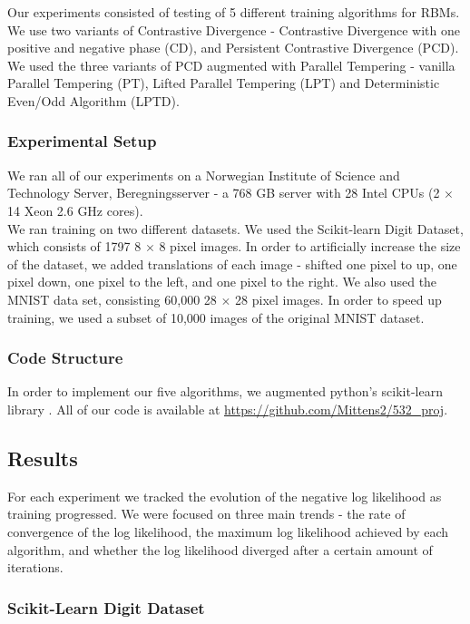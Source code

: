 Our experiments consisted of testing of 5 different training algorithms for RBMs. We use two variants of Contrastive Divergence  - Contrastive Divergence with one positive and negative phase (CD), and Persistent Contrastive Divergence (PCD). We used the three variants of PCD augmented with Parallel Tempering - vanilla Parallel Tempering (PT), Lifted Parallel Tempering (LPT) and Deterministic Even/Odd Algorithm (LPTD). \\

\subsubsection{Experimental Setup}
We ran all of our experiments on a Norwegian Institute of Science and Technology Server, Beregningsserver - a 768 GB server with 28 Intel CPUs (2 $\times$ 14 Xeon 2.6 GHz cores).\\

We ran training on two different datasets. We used the Scikit-learn Digit Dataset, which consists of 1797 8 $\times$ 8 pixel images. In order to artificially increase the size of the dataset, we added translations of each image - shifted one pixel to up, one pixel down, one pixel to the left, and one pixel to the right. We also used the MNIST data set, consisting 60,000 28 $\times$ 28 pixel images. In order to speed up training, we used a subset of 10,000 images of the original MNIST dataset.

\subsubsection{Code Structure}
In order to implement our five algorithms, we augmented python's scikit-learn library \cite{pedregosa2011scikit}. All of our code is available at \url{https://github.com/Mittens2/532_proj}.

\subsection{Results}
For each experiment we tracked the evolution of the negative log likelihood as training progressed. We were focused on three main trends - the rate of convergence of the log likelihood, the maximum log likelihood achieved by each algorithm, and whether the log likelihood diverged after a certain amount of iterations.\\

\subsubsection{Scikit-Learn Digit Dataset}

